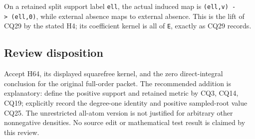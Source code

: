 On a retained split support label \texttt{ell}, the actual induced map is \texttt{(ell,v)\ -\textgreater{}\ (ell,0)}, while external absence maps to external absence. This is the lift of CQ29 by the stated H4; its coefficient kernel is all of \texttt{E}, exactly as CQ29 records.

\subsection{Review disposition}\label{review-disposition}

Accept H64, its displayed squarefree kernel, and the zero direct-integral conclusion for the original full-order packet. The recommended addition is explanatory: define the positive support and retained metric by CQ3, CQ14, CQ19; explicitly record the degree-one identity and positive sampled-root value CQ25. The unrestricted all-atom version is not justified for arbitrary other nonnegative densities. No source edit or mathematical test result is claimed by this review.
